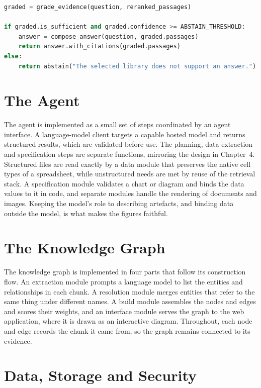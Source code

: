 \begin{lstlisting}[language=Python,caption={Simplified grade-then-answer decision in the chat runtime.},label={lst:abstain}]
graded = grade_evidence(question, reranked_passages)

if graded.is_sufficient and graded.confidence >= ABSTAIN_THRESHOLD:
    answer = compose_answer(question, graded.passages)
    return answer.with_citations(graded.passages)
else:
    return abstain("The selected library does not support an answer.")
\end{lstlisting}

\section{The Agent}

The agent is implemented as a small set of steps coordinated by an agent
interface. A language-model client targets a capable hosted model and returns
structured results, which are validated before use. The planning, data-extraction
and specification steps are separate functions, mirroring the design in
Chapter~4. Structured files are read exactly by a data module that preserves the
native cell types of a spreadsheet, while unstructured needs are met by reuse of
the retrieval stack. A specification module validates a chart or diagram and binds
the data values to it in code, and separate modules handle the rendering of
documents and images. Keeping the model's role to describing artefacts, and
binding data outside the model, is what makes the figures faithful.

\section{The Knowledge Graph}

The knowledge graph is implemented in four parts that follow its construction
flow. An extraction module prompts a language model to list the entities and
relationships in each chunk. A resolution module merges entities that refer to the
same thing under different names. A build module assembles the nodes and edges and
scores their weights, and an interface module serves the graph to the web
application, where it is drawn as an interactive diagram. Throughout, each node
and edge records the chunk it came from, so the graph remains connected to its
evidence.

\section{Data, Storage and Security}

